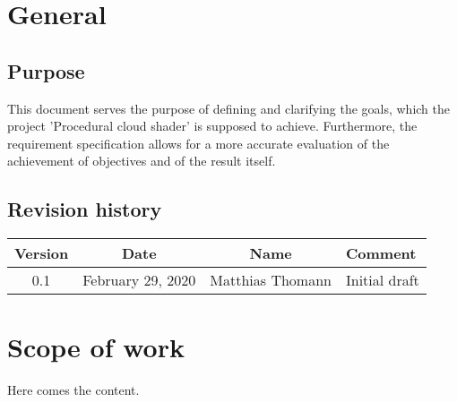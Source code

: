 \documentclass[a4paper,11pt]{article}
\begin{document}
\title{\doctitle}
\author{\docauthor}
\date{\versiondate} 

\newcommand{\docsubtitle}{Requirement specification}
\newcommand{\docauthor}{Matthias Thomann}
\newcommand{\doctitle}{Procedural cloud shader}
\newcommand{\fieldofstudies}{BSc in Computer Science}
\newcommand{\specialisation}{Computer perception and virtual reality}
\newcommand{\prof}{Prof. Urs K\"unzler}

\newcommand{\versionnumber}{0.1}
\newcommand{\versiondate}{\today}

\titlespacing*{\section} {0pt}{7.5ex plus 1ex minus .2ex}{2.3ex plus .2ex}
\titlespacing*{\subsection} {0pt}{2.25ex plus 1ex minus .2ex}{1.5ex plus .2ex}



\tableofcontents
\clearpage

\section{General}

\subsection{Purpose}
This document serves the purpose of defining and clarifying the goals, which the project 'Procedural cloud shader' is supposed to achieve. Furthermore, the requirement specification allows for a more accurate evaluation of the achievement of objectives and of the result itself.

\subsection{Revision history}

\begin{tabularx}{\textwidth}{|c|c|c|X|}
    \hline
    Version & Date & Name & Comment \\ 
    \hline
    0.1 & February 29, 2020 & Matthias Thomann & Initial draft \\ 
    \hline
\end{tabularx}

\section{Scope of work}
Here comes the content.

\clearpage

\printglossaries

\clearpage
\end{document}
